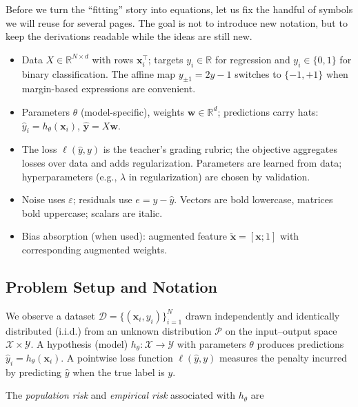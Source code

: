 \noindent Before we turn the ``fitting'' story into equations, let us fix the handful of symbols we will reuse for several pages. The goal is not to introduce new notation, but to keep the derivations readable while the ideas are still new.
\begin{itemize}
  \item Data \(X \in \mathbb{R}^{N\times d}\) with rows \(\mathbf{x}_i^\top\); targets \(y_i\in\mathbb{R}\) for regression and \(y_i \in \{0,1\}\) for binary classification. The affine map \(y_{\pm1}=2y-1\) switches to \(\{-1,+1\}\) when margin-based expressions are convenient.
  \item Parameters \(\theta\) (model-specific), weights \(\mathbf{w}\in\mathbb{R}^d\); predictions carry hats: \(\hat{y}_i = h_\theta(\mathbf{x}_i)\), \(\hat{\mathbf{y}}=X\mathbf{w}\).
  \item The loss \(\ell(\hat{y}, y)\) is the teacher's grading rubric; the objective aggregates losses over data and adds regularization. Parameters are learned from data; hyperparameters (e.g., \(\lambda\) in regularization) are chosen by validation.
  \item Noise uses \(\varepsilon\); residuals use \(e=y-\hat{y}\). Vectors are bold lowercase, matrices bold uppercase; scalars are italic.
  \item Bias absorption (when used): augmented feature \(\tilde{\mathbf{x}}=[\mathbf{x};1]\) with corresponding augmented weights.
\end{itemize}

\subsection{Problem Setup and Notation}
\label{sec:supervised_problem_setup_and_notation}

We observe a dataset \(\mathcal D = \{(\mathbf{x}_i, y_i)\}_{i=1}^N\) drawn independently and identically distributed (i.i.d.) from an unknown distribution \(\mathcal P\) on the input--output space \(\mathcal X \times \mathcal Y\). A hypothesis (model) \(h_\theta: \mathcal X \to \mathcal Y\) with parameters \(\theta\) produces predictions \(\hat{y}_i = h_\theta(\mathbf{x}_i)\). A pointwise loss function \(\ell(\hat{y}, y)\) measures the penalty incurred by predicting \(\hat{y}\) when the true label is \(y\).

The \emph{population risk} and \emph{empirical risk} associated with \(h_\theta\) are

